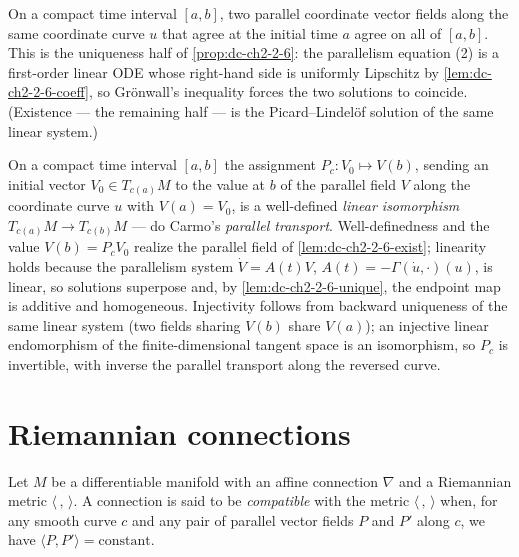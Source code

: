 \begin{lemma}
  \label{lem:dc-ch2-2-6-unique}
  \leanok
  On a compact time interval $[a,b]$, two parallel coordinate vector fields along
  the same coordinate curve $u$ that agree at the initial time $a$ agree on all of
  $[a,b]$. This is the uniqueness half of \cref{prop:dc-ch2-2-6}: the parallelism
  equation (2) is a first-order linear ODE whose right-hand side is uniformly
  Lipschitz by \cref{lem:dc-ch2-2-6-coeff}, so Grönwall's inequality forces the two
  solutions to coincide. (Existence — the remaining half — is the Picard--Lindelöf
  solution of the same linear system.)
\end{lemma}

\begin{lemma}
  \label{lem:dc-ch2-2-6-transport}
  \leanok
  On a compact time interval $[a,b]$ the assignment $P_c:V_0\mapsto V(b)$, sending an
  initial vector $V_0\in T_{c(a)}M$ to the value at $b$ of the parallel field $V$ along
  the coordinate curve $u$ with $V(a)=V_0$, is a well-defined \emph{linear isomorphism}
  $T_{c(a)}M\to T_{c(b)}M$ — do Carmo's \emph{parallel transport}. Well-definedness and
  the value $V(b)=P_c V_0$ realize the parallel field of \cref{lem:dc-ch2-2-6-exist};
  linearity holds because the parallelism system $\dot V=A(t)V$, $A(t)=-\Gamma(\dot u,\cdot)(u)$,
  is linear, so solutions superpose and, by \cref{lem:dc-ch2-2-6-unique}, the endpoint map is
  additive and homogeneous. Injectivity follows from backward uniqueness of the same linear
  system (two fields sharing $V(b)$ share $V(a)$); an injective linear endomorphism of the
  finite-dimensional tangent space is an isomorphism, so $P_c$ is invertible, with inverse the
  parallel transport along the reversed curve.
\end{lemma}

\section{Riemannian connections}

\begin{definition}
  \label{def:dc-ch2-3-1}
  \leanok
  Let $M$ be a differentiable manifold with an affine connection $\nabla$ and a
  Riemannian metric $\langle\,,\,\rangle$. A connection is said to be \emph{compatible}
  with the metric $\langle\,,\,\rangle$ when, for any smooth curve $c$ and any pair
  of parallel vector fields $P$ and $P'$ along $c$, we have
  $\langle P,P'\rangle=\text{constant}$.
\end{definition}

